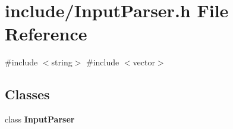 \section{include/\+Input\+Parser.h File Reference}
\label{_input_parser_8h}
{\ttfamily \#include $<$string$>$}\newline
{\ttfamily \#include $<$vector$>$}\newline
\subsection*{Classes}
\begin{DoxyCompactItemize}
\item 
class \textbf{ Input\+Parser}
\end{DoxyCompactItemize}
